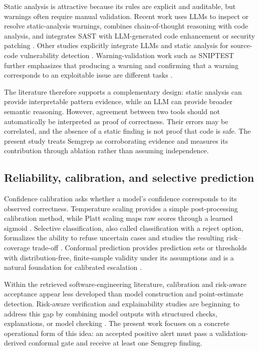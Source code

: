 \documentclass[pdflatex,sn-mathphys-num]{sn-jnl}
\begin{document}
Static analysis is attractive because its rules are explicit and auditable, but warnings often require manual validation. Recent work uses LLMs to inspect or resolve static-analysis warnings, combines chain-of-thought reasoning with code analysis, and integrates SAST with LLM-generated code enhancement or security patching \cite{Wen2024,Huang2026,Lee2026,Alrashedy2025}. Other studies explicitly integrate LLMs and static analysis for source-code vulnerability detection \cite{Ciavatta2026}. Warning-validation work such as SNIPTEST further emphasizes that producing a warning and confirming that a warning corresponds to an exploitable issue are different tasks \cite{Murali2026}.

The literature therefore supports a complementary design: static analysis can provide interpretable pattern evidence, while an LLM can provide broader semantic reasoning. However, agreement between two tools should not automatically be interpreted as proof of correctness. Their errors may be correlated, and the absence of a static finding is not proof that code is safe. The present study treats Semgrep as corroborating evidence and measures its contribution through ablation rather than assuming independence.

\subsection{Reliability, calibration, and selective prediction}

Confidence calibration asks whether a model's confidence corresponds to its observed correctness. Temperature scaling provides a simple post-processing calibration method, while Platt scaling maps raw scores through a learned sigmoid \cite{Guo2017Calibration,Platt1999Probabilistic}. Selective classification, also called classification with a reject option, formalizes the ability to refuse uncertain cases and studies the resulting risk--coverage trade-off \cite{Geifman2017Selective}. Conformal prediction provides prediction sets or thresholds with distribution-free, finite-sample validity under its assumptions and is a natural foundation for calibrated escalation \cite{Angelopoulos2023Conformal}.

Within the retrieved software-engineering literature, calibration and risk-aware acceptance appear less developed than model construction and point-estimate detection. Risk-aware verification and explainability studies are beginning to address this gap by combining model outputs with structured checks, explanations, or model checking \cite{Alharby2026,Dubey2026,Ahmad20253321}. The present work focuses on a concrete operational form of this idea: an accepted positive alert must pass a validation-derived conformal gate and receive at least one Semgrep finding.
\end{document}
